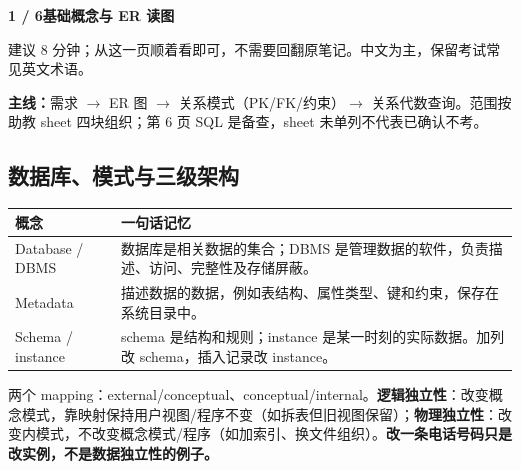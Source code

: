 \documentclass[11pt,a4paper]{article}
\newcommand{\stitle}[2]{{\sffamily\LARGE\bfseries\color{CUHKPurple}#1}\par{\small\color{Muted}#2}\par\vspace{3mm}}
\newcommand{\key}[1]{\textbf{\color{CUHKPurple}#1}}
\begin{document}
\fontsize{10.5}{13.5}\selectfont
\stitle{1 / 6\quad 基础概念与 ER 读图}{建议 8 分钟；从这一页顺着看即可，不需要回翻原笔记。中文为主，保留考试常见英文术语。}
\textbf{主线：}需求 $\to$ ER 图 $\to$ 关系模式（PK/FK/约束）$\to$ 关系代数查询。范围按助教 sheet 四块组织；第 6 页 SQL 是备查，sheet 未单列不代表已确认不考。

\subsection{数据库、模式与三级架构}
\begin{tabularx}{\linewidth}{@{}lX@{}}
\toprule 概念 & 一句话记忆 \\
\midrule
Database / DBMS & 数据库是相关数据的集合；DBMS 是管理数据的软件，负责描述、访问、完整性及存储屏蔽。\\
Metadata & 描述数据的数据，例如表结构、属性类型、键和约束，保存在系统目录中。\\
Schema / instance & schema 是结构和规则；instance 是某一时刻的实际数据。加列改 schema，插入记录改 instance。\\
\bottomrule
\end{tabularx}
\begin{center}\end{center}
两个 mapping：external/conceptual、conceptual/internal。\key{逻辑独立性}：改变概念模式，靠映射保持用户视图/程序不变（如拆表但旧视图保留）；\key{物理独立性}：改变内模式，不改变概念模式/程序（如加索引、换文件组织）。\textbf{改一条电话号码只是改实例，不是数据独立性的例子。}
\end{document}
